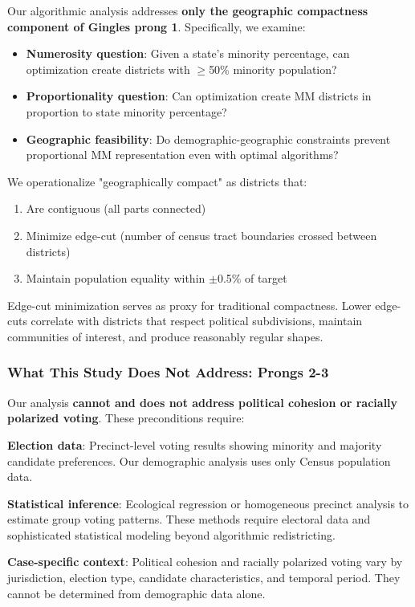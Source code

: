 Our algorithmic analysis addresses \textbf{only the geographic compactness component of Gingles prong 1}. Specifically, we examine:

\begin{itemize}
    \item \textbf{Numerosity question}: Given a state's minority percentage, can optimization create districts with $\geq$50\% minority population?
    \item \textbf{Proportionality question}: Can optimization create MM districts in proportion to state minority percentage?
    \item \textbf{Geographic feasibility}: Do demographic-geographic constraints prevent proportional MM representation even with optimal algorithms?
\end{itemize}

We operationalize "geographically compact" as districts that:
\begin{enumerate}
    \item Are contiguous (all parts connected)
    \item Minimize edge-cut (number of census tract boundaries crossed between districts)
    \item Maintain population equality within $\pm$0.5\% of target
\end{enumerate}

Edge-cut minimization serves as proxy for traditional compactness. Lower edge-cuts correlate with districts that respect political subdivisions, maintain communities of interest, and produce reasonably regular shapes.

\subsubsection{What This Study Does Not Address: Prongs 2-3}

Our analysis \textbf{cannot and does not address political cohesion or racially polarized voting}. These preconditions require:

\textbf{Election data}: Precinct-level voting results showing minority and majority candidate preferences. Our demographic analysis uses only Census population data.

\textbf{Statistical inference}: Ecological regression or homogeneous precinct analysis to estimate group voting patterns. These methods require electoral data and sophisticated statistical modeling beyond algorithmic redistricting.

\textbf{Case-specific context}: Political cohesion and racially polarized voting vary by jurisdiction, election type, candidate characteristics, and temporal period. They cannot be determined from demographic data alone.

